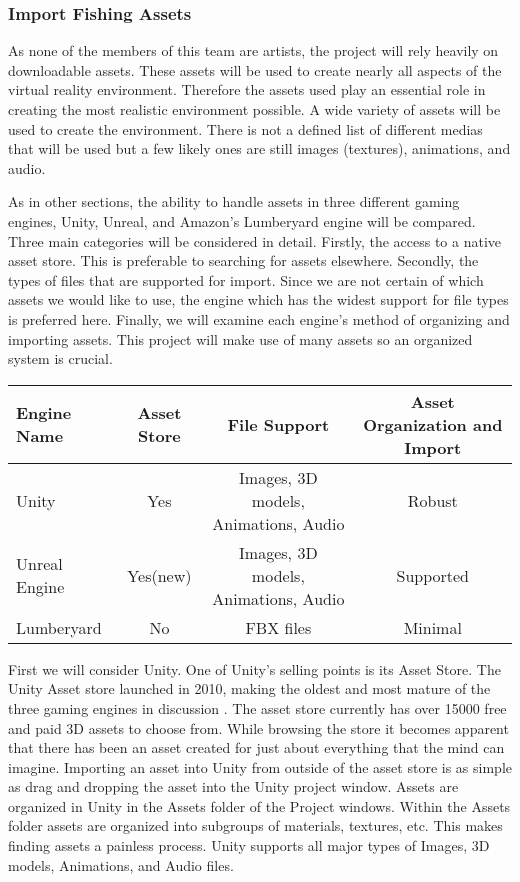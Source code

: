 \documentclass[10pt,journal,compsoc,onecolumn, draftclsnofoot]{IEEEtran}
\begin{document}
\subsubsection{Import Fishing Assets}
As none of the members of this team are artists, the project will rely heavily on downloadable assets.
These assets will be used to create nearly all aspects of the virtual reality environment.
Therefore the assets used play an essential role in creating the most realistic environment possible.
A wide variety of assets will be used to create the environment.
There is not a defined list of different medias that will be used but a few likely ones are still images (textures), animations, and audio.

As in other sections, the ability to handle assets in three different gaming engines, Unity, Unreal, and Amazon's Lumberyard engine will be compared.
Three main categories will be considered in detail.
Firstly, the access to a native asset store.
This is preferable to searching for assets elsewhere.
Secondly, the types of files that are supported for import.
Since we are not certain of which assets we would like to use, the engine which has the widest support for file types is preferred here.
Finally, we will examine each engine's method of organizing and importing assets.
This project will make use of many assets so an organized system is crucial.

\vspace{2mm}
\begin{table}[h!]
\centering
  \begin{tabular}{ | l || c | c | c | }
  \hline
  Engine Name & Asset Store & File Support & Asset Organization and Import\\
  \hline
  Unity & Yes & Images, 3D models, Animations, Audio & Robust\\ \hline
  Unreal Engine & Yes(new) & Images, 3D models, Animations, Audio & Supported\\ \hline
  Lumberyard & No & FBX files & Minimal\\ \hline
  \end{tabular}
\end{table}
\vspace{2mm}

First we will consider Unity.
One of Unity's selling points is its Asset Store.
The Unity Asset store launched in 2010, making the oldest and most mature of the three gaming engines in discussion \cite{unity_store_age}.
The asset store currently has over 15000 free and paid 3D assets to choose from.
While browsing the store it becomes apparent that there has been an asset created for just about everything that the mind can imagine.
Importing an asset into Unity from outside of the asset store is as simple as drag and dropping the asset into the Unity project window.
Assets are organized in Unity in the Assets folder of the Project windows.
Within the Assets folder assets are organized into subgroups of materials, textures, etc.
This makes finding assets a painless process.
Unity supports all major types of Images, 3D models, Animations, and Audio files.
\end{document}
